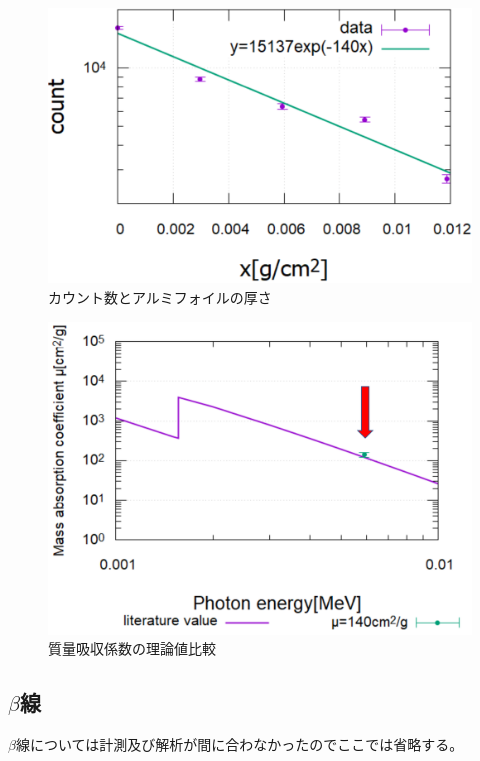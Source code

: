 \documentclass[a4j]{jsarticle}
\begin{document}
	\begin{figure}[htbp]
	\centering
	\includegraphics[width=12cm]{relation_xray+object.png}
	\caption{カウント数とアルミフォイルの厚さ}
	\label{x3}
	\end{figure}

	\begin{figure}[htbp]
	\centering
	\includegraphics[width=12cm]{xray_massabs.png}
	\caption{質量吸収係数の理論値比較}
	\label{x4}
	\end{figure}
	
	\subsection{$\beta$線}
	$\beta$線については計測及び解析が間に合わなかったのでここでは省略する。
	
\end{document}
